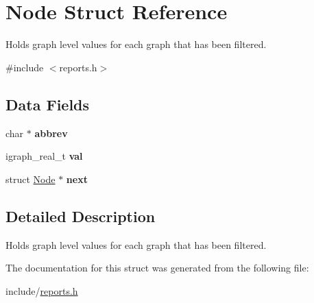 \hypertarget{struct_node}{}\section{Node Struct Reference}
\label{struct_node}


Holds graph level values for each graph that has been filtered.  




{\ttfamily \#include $<$reports.\+h$>$}

\subsection*{Data Fields}
\begin{DoxyCompactItemize}
\item 
\mbox{\label{struct_node_a178c16b0a92c53ed7c1f4722db90a876}} 
char $\ast$ {\bfseries abbrev}
\item 
\mbox{\label{struct_node_ab4a7695864395a8fc4ee1182952ed4f4}} 
igraph\+\_\+real\+\_\+t {\bfseries val}
\item 
\mbox{\label{struct_node_aa162dd1e0693188a22b1f13b9a2a0ef0}} 
struct \mbox{\hyperlink{struct_node}{Node}} $\ast$ {\bfseries next}
\end{DoxyCompactItemize}


\subsection{Detailed Description}
Holds graph level values for each graph that has been filtered. 

The documentation for this struct was generated from the following file\+:\begin{DoxyCompactItemize}
\item 
include/\mbox{\hyperlink{reports_8h}{reports.\+h}}\end{DoxyCompactItemize}
